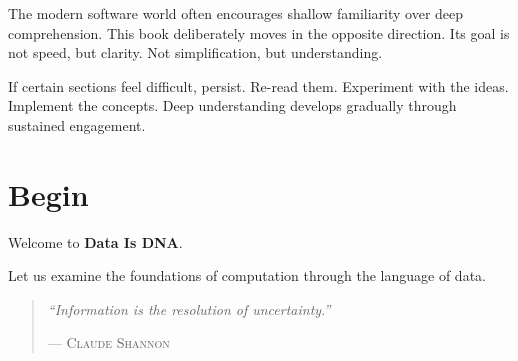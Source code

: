 The modern software world often encourages shallow familiarity over deep comprehension. This book deliberately moves in the opposite direction. Its goal is not speed, but clarity. Not simplification, but understanding.

If certain sections feel difficult, persist. Re-read them. Experiment with the ideas. Implement the concepts. Deep understanding develops gradually through sustained engagement.

\section*{Begin}

Welcome to \textbf{Data Is DNA}.

Let us examine the foundations of computation through the language of data.

\vfill

\begin{quote}
\textit{``Information is the resolution of uncertainty.''}

\hfill--- \textsc{Claude Shannon}
\end{quote}

\clearpage